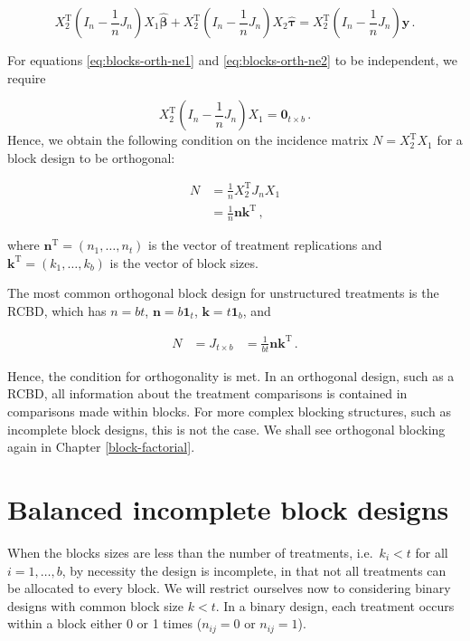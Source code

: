 \documentclass[
]{book}
\theoremstyle{definition}
\theoremstyle{definition}
\theoremstyle{definition}
\theoremstyle{definition}
\theoremstyle{remark}
\begin{document}
\begin{equation}
X_2^{\mathrm{T}}\left(I_n - \frac{1}{n}J_n\right)X_1\hat{\boldsymbol{\beta}} + X_2^{\mathrm{T}}\left(I_n - \frac{1}{n}J_n\right)X_2\hat{\boldsymbol{\tau}} = X_2^{\mathrm{T}}\left(I_n - \frac{1}{n}J_n\right)\boldsymbol{y}\,.
\label{eq:blocks-orth-ne2}
\end{equation}

For equations \eqref{eq:blocks-orth-ne1} and \eqref{eq:blocks-orth-ne2} to be independent, we require

\[
X_2^{\mathrm{T}}\left(I_n - \frac{1}{n}J_n\right)X_1 = \boldsymbol{0}_{t\times b}\,.
\]
Hence, we obtain the following condition on the incidence matrix \(N = X_2^{\mathrm{T}}X_1\) for a block design to be orthogonal:

\begin{align}
N & = \frac{1}{n}X_2^{\mathrm{T}}J_nX_1 \\
& = \frac{1}{n}\boldsymbol{n}\boldsymbol{k}^{\mathrm{T}}\,,
\end{align}

where \(\boldsymbol{n}^{\mathrm{T}} = (n_1,\ldots, n_t)\) is the vector of treatment replications and \(\boldsymbol{k}^{\mathrm{T}} = (k_1,\ldots, k_b)\) is the vector of block sizes.

The most common orthogonal block design for unstructured treatments is the RCBD, which has \(n = bt\), \(\boldsymbol{n} = b\boldsymbol{1}_t\), \(\boldsymbol{k} = t\boldsymbol{1}_b\), and

\begin{align}
N & = J_{t \times b}
& = \frac{1}{bt}\boldsymbol{n}\boldsymbol{k}^{\mathrm{T}}\,.
\end{align}

Hence, the condition for orthogonality is met. In an orthogonal design, such as a RCBD, all information about the treatment comparisons is contained in comparisons made within blocks. For more complex blocking structures, such as incomplete block designs, this is not the case. We shall see orthogonal blocking again in Chapter \ref{block-factorial}.

\hypertarget{sec-bibd}{%
\section{Balanced incomplete block designs}\label{sec-bibd}}

When the blocks sizes are less than the number of treatments, i.e.~\(k_i < t\) for all \(i=1,\ldots, b\), by necessity the design is incomplete, in that not all treatments can be allocated to every block. We will restrict ourselves now to considering binary designs with common block size \(k<t\). In a binary design, each treatment occurs within a block either 0 or 1 times (\(n_{ij}=0\) or \(n_{ij}=1\)).
\end{document}
